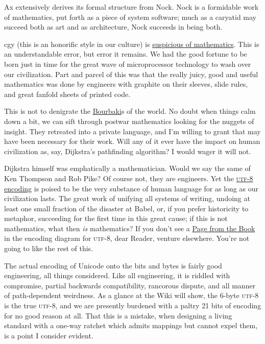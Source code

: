 \documentclass[twoside]{article}
\begin{document}
Ax extensively derives its formal structure from Nock. Nock is a formidable work of mathematics, put forth as a piece of system software; much as a caryatid may succeed both as art and as architecture, Nock succeeds in being both.

cgy (this is an honorific style in our culture) is \href{https://unqualifiedreservations.wordpress.com/2007/08/02/whats-wrong-with-cs-research/}{suspicious of mathematics}. This is an understandable error, but error it remains. We had the good fortune to be born just in time for the great wave of microprocessor technology to wash over our civilization. Part and parcel of this was that the really juicy, good and useful mathematics was done by engineers with graphite on their sleeves, slide rules, and great fanfold sheets of printed code.

This is not to denigrate the \href{https://en.wikipedia.org/wiki/Nicolas_Bourbaki}{Bourbaki}s of the world. No doubt when things calm down a bit, we can sift through postwar mathematics looking for the nuggets of insight. They retreated into a private language, and I'm willing to grant that may have been necessary for their work.  Will any of it ever have the impact on human civilization as, say, Dijkstra's pathfinding algorithm? I would wager it will not.

Dijkstra himself was emphatically a mathematician. Would we say the same of Ken Thompson and Rob Pike? Of course not, they are engineers. Yet the \href{https://en.wikipedia.org/wiki/UTF-8#History}{\textsc{utf}-8 encoding} is poised to be the very substance of human language for as long as our civilization lasts. The great work of unifying all systems of writing, undoing at least one small fraction of the disaster at Babel, or, if you prefer historicity to metaphor, succeeding for the first time in this great cause; if this is not mathematics, what then \emph{is} mathematics? If you don't see a \href{https://en.wikipedia.org/wiki/Erdős_Pál}{Page from the Book} in the encoding diagram for \textsc{utf}-8, dear Reader, venture elsewhere. You're not going to like the rest of this.

The actual encoding of Unicode onto the bits and bytes is fairly good engineering, all things considered. Like all engineering, it is riddled with compromise, partial backwards compatibility, rancorous dispute, and all manner of path-dependent weirdness. As a glance at the Wiki will show, the 6-byte \textsc{utf}-8 is the true \textsc{utf}-8, and we are presently burdened with a paltry 21 bits of encoding for no good reason at all. That this is a mistake, when designing a living standard with a one-way ratchet which admits mappings but cannot expel them, is a point I consider evident.
\end{document}
